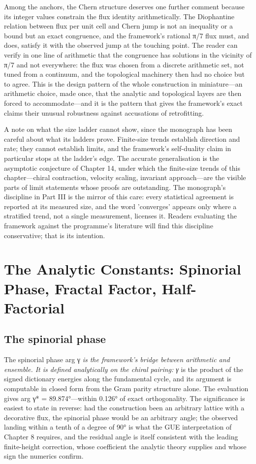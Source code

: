 \documentclass[10pt]{article}
\begin{document}
Among the anchors, the Chern structure deserves one further comment because its integer values constrain the flux identity arithmetically. The Diophantine relation between flux per unit cell and Chern jump is not an inequality or a bound but an exact congruence, and the framework's rational π/7 flux must, and does, satisfy it with the observed jump at the touching point. The reader can verify in one line of arithmetic that the congruence has solutions in the vicinity of π/7 and not everywhere: the flux was chosen from a discrete arithmetic set, not tuned from a continuum, and the topological machinery then had no choice but to agree. This is the design pattern of the whole construction in miniature---an arithmetic choice, made once, that the analytic and topological layers are then forced to accommodate---and it is the pattern that gives the framework's exact claims their unusual robustness against accusations of retrofitting.

A note on what the size ladder cannot show, since the monograph has been careful about what its ladders prove. Finite-size trends establish direction and rate; they cannot establish limits, and the framework's self-duality claim in particular stops at the ladder's edge. The accurate generalisation is the asymptotic conjecture of Chapter 14, under which the finite-size trends of this chapter---chiral contraction, velocity scaling, invariant approach---are the visible parts of limit statements whose proofs are outstanding. The monograph's discipline in Part III is the mirror of this care: every statistical agreement is reported at its measured size, and the word 'converges' appears only where a stratified trend, not a single measurement, licenses it. Readers evaluating the framework against the programme's literature will find this discipline conservative; that is its intention.

\section{The Analytic Constants: Spinorial Phase, Fractal Factor, Half-Factorial}\label{sec:ch7}
\subsection{The spinorial phase}\label{sec:71}
The spinorial phase arg γ\emph{ is the framework's bridge between arithmetic and ensemble. It is defined analytically on the chiral pairing: γ} is the product of the signed dictionary energies along the fundamental cycle, and its argument is computable in closed form from the Gram parity structure alone. The evaluation gives arg γ* = 89.874°---within 0.126° of exact orthogonality. The significance is easiest to state in reverse: had the construction been an arbitrary lattice with a decorative flux, the spinorial phase would be an arbitrary angle; the observed landing within a tenth of a degree of 90° is what the GUE interpretation of Chapter 8 requires, and the residual angle is itself consistent with the leading finite-height correction, whose coefficient the analytic theory supplies and whose sign the numerics confirm.
\end{document}
